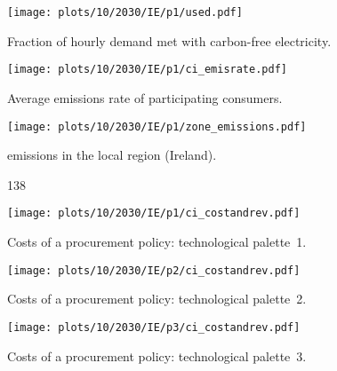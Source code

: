\begin{figure*}
    \centering
    \begin{subfigure}{0.5\textwidth}
        \centering
        \caption{Fraction of hourly demand met with carbon-free electricity.}
        \texttt{[image: plots/10/2030/IE/p1/used.pdf]}
        \label{fig:10-2030-IE-p1-used}
    \end{subfigure}%
    \begin{subfigure}{0.5\textwidth}
        \centering
        \caption{Average emissions rate of participating consumers.}
        \texttt{[image: plots/10/2030/IE/p1/ci\_emisrate.pdf]}
        \label{fig:10-2030-IE-p1-ci_emisrate}
    \end{subfigure}

    \begin{subfigure}{0.5\textwidth}
        \centering
        \caption{\co emissions in the local region (Ireland).}
        \texttt{[image: plots/10/2030/IE/p1/zone\_emissions.pdf]}
        \label{fig:10-2030-IE-p1-zone_emissions}
    \end{subfigure}%
    \begin{subfigure}{0.5\textwidth}138
        \caption{Costs of a procurement policy: technological palette~1.}
        \texttt{[image: plots/10/2030/IE/p1/ci\_costandrev.pdf]}
        \label{fig:10-2030-IE-p1-ci_costandrev}
    \end{subfigure}%

    \begin{subfigure}{0.5\textwidth}
        \centering
        \caption{Costs of a procurement policy: technological palette~2.}
        \texttt{[image: plots/10/2030/IE/p2/ci\_costandrev.pdf]}
        \label{fig:10-2030-IE-p2-ci_costandrev}
    \end{subfigure}%
    \begin{subfigure}{0.5\textwidth}
        \centering
        \caption{Costs of a procurement policy: technological palette~3.}
        \texttt{[image: plots/10/2030/IE/p3/ci\_costandrev.pdf]}
        \label{fig:10-2030-IE-p3-ci_costandrev}
    \end{subfigure}

    \caption{Results for the case of Ireland 2030. 10\% participation rate. 
    Data for the Figures \ref{fig:10-2030-IE-p1-used}--\ref{fig:10-2030-IE-p1-zone_emissions} is for the technological palette~1 scenario.}
    \label{fig:10-2030-IE-6plots}
\end{figure*}



